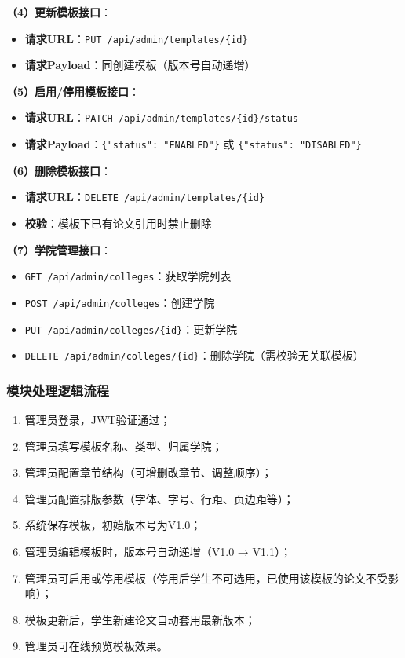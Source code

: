 \documentclass{../template/softeng}
\begin{document}
	\textbf{（4）更新模板接口}：
	\begin{itemize}
		\item \textbf{请求URL}：\texttt{PUT /api/admin/templates/\{id\}}
		\item \textbf{请求Payload}：同创建模板（版本号自动递增）
	\end{itemize}

	\textbf{（5）启用/停用模板接口}：
	\begin{itemize}
		\item \textbf{请求URL}：\texttt{PATCH /api/admin/templates/\{id\}/status}
		\item \textbf{请求Payload}：\texttt{\{"status": "ENABLED"\}} 或 \texttt{\{"status": "DISABLED"\}}
	\end{itemize}

	\textbf{（6）删除模板接口}：
	\begin{itemize}
		\item \textbf{请求URL}：\texttt{DELETE /api/admin/templates/\{id\}}
		\item \textbf{校验}：模板下已有论文引用时禁止删除
	\end{itemize}

	\textbf{（7）学院管理接口}：
	\begin{itemize}
		\item \texttt{GET /api/admin/colleges}：获取学院列表
		\item \texttt{POST /api/admin/colleges}：创建学院
		\item \texttt{PUT /api/admin/colleges/\{id\}}：更新学院
		\item \texttt{DELETE /api/admin/colleges/\{id\}}：删除学院（需校验无关联模板）
	\end{itemize}

	\subsubsection{模块处理逻辑流程}
	\begin{enumerate}
		\item 管理员登录，JWT验证通过；
		\item 管理员填写模板名称、类型、归属学院；
		\item 管理员配置章节结构（可增删改章节、调整顺序）；
		\item 管理员配置排版参数（字体、字号、行距、页边距等）；
		\item 系统保存模板，初始版本号为V1.0；
		\item 管理员编辑模板时，版本号自动递增（V1.0 → V1.1）；
		\item 管理员可启用或停用模板（停用后学生不可选用，已使用该模板的论文不受影响）；
		\item 模板更新后，学生新建论文自动套用最新版本；
		\item 管理员可在线预览模板效果。
	\end{enumerate}
\end{document}

